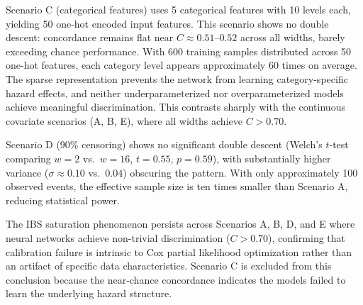 \documentclass[12pt,a4paper]{article}
\begin{document}
Scenario C (categorical features) uses 5 categorical features with 10 levels each, yielding 50 one-hot encoded input features. This scenario shows no double descent: concordance remains flat near $C \approx 0.51$--$0.52$ across all widths, barely exceeding chance performance. With 600 training samples distributed across 50 one-hot features, each category level appears approximately 60 times on average. The sparse representation prevents the network from learning category-specific hazard effects, and neither underparameterized nor overparameterized models achieve meaningful discrimination. This contrasts sharply with the continuous covariate scenarios (A, B, E), where all widths achieve $C > 0.70$.

Scenario D (90\% censoring) shows no significant double descent (Welch's $t$-test comparing $w=2$ vs.\ $w=16$, $t = 0.55$, $p = 0.59$), with substantially higher variance ($\sigma \approx 0.10$ vs.\ $0.04$) obscuring the pattern. With only approximately 100 observed events, the effective sample size is ten times smaller than Scenario A, reducing statistical power.

The IBS saturation phenomenon persists across Scenarios A, B, D, and E where neural networks achieve non-trivial discrimination ($C > 0.70$), confirming that calibration failure is intrinsic to Cox partial likelihood optimization rather than an artifact of specific data characteristics. Scenario C is excluded from this conclusion because the near-chance concordance indicates the models failed to learn the underlying hazard structure.

\subsection{}


\end{document}
